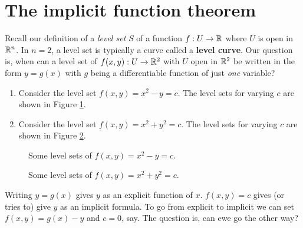 \section{The implicit function theorem}

Recall our definition of a \emph{level set} $S$ of a function $f: U \to \mathbb{R}$ where $U$ is open in $\mathbb{R}^n$. In $n = 2$, a level set is typically a curve called a \textbf{level curve}. Our question is, when can a level set of $f(x, y): U \to \mathbb{R}^2$ with $U$ open in $\mathbb{R}^2$ be written in the form $y = g(x)$ with $g$ being a differentiable function of just \emph{one} variable?

\begin{example}
    \begin{enumerate}
        \item Consider the level set $f(x, y) = x^2 - y = c$. The level sets for varying $c$ are shown in Figure \ref{fig:level-set-ex-1}.
        \item Consider the level set $f(x, y) = x^2 + y^2 = c$. The level sets for varying $c$ are shown in Figure \ref{fig:level-set-ex-2}.
    \end{enumerate}
\end{example}

\begin{figure}
    \centering
    \caption{Some level sets of $f(x, y) = x^2 - y = c$.}
    \label{fig:level-set-ex-1}
\end{figure}

\begin{figure}
    \centering
    \caption{Some level sets of $f(x, y) = x^2 + y^2 = c$.}
    \label{fig:level-set-ex-2}
\end{figure}

Writing $y = g(x)$ gives $y$ as an explicit function of $x$. $f(x, y) = c$ gives (or tries to) give $y$ as an implicit formula. To go from explicit to implicit we can set $f(x, y) = g(x) - y$ and $c = 0$, say. The question is, can ewe go the other way?
